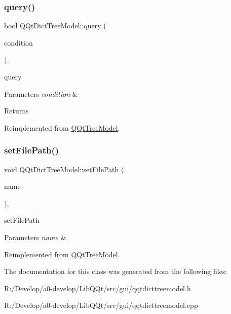 \subsubsection{\texorpdfstring{query()}{query()}}
{\footnotesize\ttfamily bool Q\+Qt\+Dict\+Tree\+Model\+::query (\begin{DoxyParamCaption}\item[{Q\+String}]{condition }\end{DoxyParamCaption})\hspace{0.3cm}{\ttfamily [override]}, {\ttfamily [virtual]}}



query 


\begin{DoxyParams}{Parameters}
{\em condition} & \\
\hline
\end{DoxyParams}
\begin{DoxyReturn}{Returns}

\end{DoxyReturn}


Reimplemented from \mbox{\hyperlink{class_q_qt_tree_model_aacd492ce920be939d95d7e1bc2978cb1}{Q\+Qt\+Tree\+Model}}.

\mbox{\label{class_q_qt_dict_tree_model_a5770f3ffdba4901cbc0f521fd930c1c1}} 
\subsubsection{\texorpdfstring{set\+File\+Path()}{setFilePath()}}
{\footnotesize\ttfamily void Q\+Qt\+Dict\+Tree\+Model\+::set\+File\+Path (\begin{DoxyParamCaption}\item[{Q\+String}]{name }\end{DoxyParamCaption})\hspace{0.3cm}{\ttfamily [override]}, {\ttfamily [virtual]}}



set\+File\+Path 


\begin{DoxyParams}{Parameters}
{\em name} & \\
\hline
\end{DoxyParams}


Reimplemented from \mbox{\hyperlink{class_q_qt_tree_model_acfeea0d58fa29b1c34c1491f6a8f0b7c}{Q\+Qt\+Tree\+Model}}.



The documentation for this class was generated from the following files\+:\begin{DoxyCompactItemize}
\item 
R\+:/\+Develop/a0-\/develop/\+Lib\+Q\+Qt/src/gui/qqtdicttreemodel.\+h\item 
R\+:/\+Develop/a0-\/develop/\+Lib\+Q\+Qt/src/gui/qqtdicttreemodel.\+cpp\end{DoxyCompactItemize}
